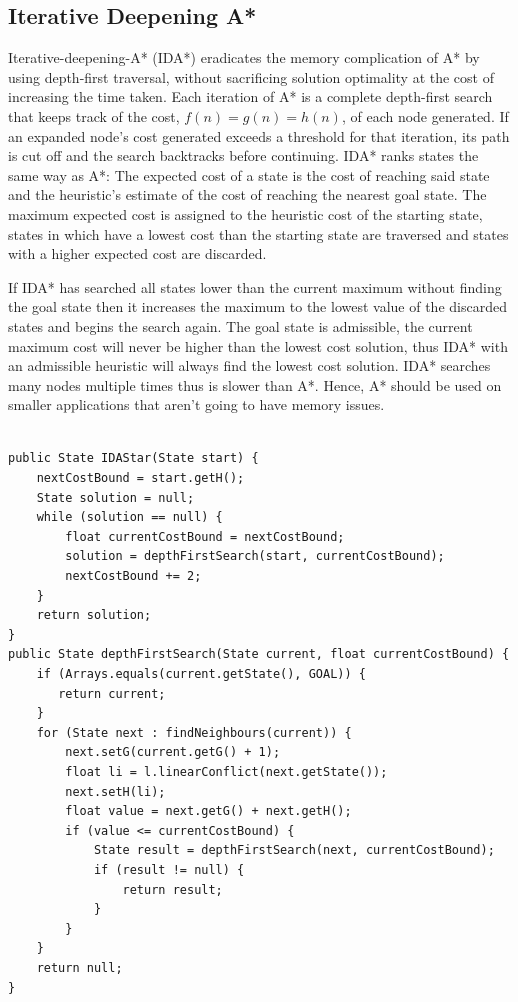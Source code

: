 \documentclass[progress]{cmpreport}
\begin{document}
\subsection{Iterative Deepening A*}
Iterative-deepening-A* (IDA*) eradicates the memory complication of A* by using depth-first traversal, without sacrificing solution optimality at the cost of increasing the time taken. Each iteration of A* is a complete depth-first search that keeps track of the cost, $f(n) = g(n) = h(n)$, of each node generated. If an expanded node's cost generated exceeds a threshold for that iteration, its path is cut off and the search backtracks before continuing. IDA* ranks states the same way as A*: The expected cost of a state is the cost of reaching said state and the heuristic's estimate of the cost of reaching the nearest goal state. The maximum expected cost is assigned to the heuristic cost of the starting state, states in which have a lowest cost than the starting state are traversed and states with a higher expected cost are discarded. 


If IDA* has searched all states lower than the current maximum without finding the goal state then it increases the maximum to the lowest value of the discarded states and begins the search again. The goal state is admissible, the current maximum cost will never be higher than the lowest cost solution, thus IDA* with an admissible heuristic will always find the lowest cost solution.  IDA* searches many nodes multiple times thus is slower than A*. Hence, A* should be used on smaller applications that aren't going to have memory issues.

\begin{verbatim}

public State IDAStar(State start) {
    nextCostBound = start.getH();
    State solution = null;
    while (solution == null) {
        float currentCostBound = nextCostBound;
        solution = depthFirstSearch(start, currentCostBound);
        nextCostBound += 2;
    }
    return solution;
}
public State depthFirstSearch(State current, float currentCostBound) {
    if (Arrays.equals(current.getState(), GOAL)) {
       return current;
    }
    for (State next : findNeighbours(current)) {
        next.setG(current.getG() + 1);
        float li = l.linearConflict(next.getState());
        next.setH(li);
        float value = next.getG() + next.getH();
        if (value <= currentCostBound) {
            State result = depthFirstSearch(next, currentCostBound);
            if (result != null) {
                return result;
            }
        }
    }
    return null;
}

\end{verbatim}
\end{document}

